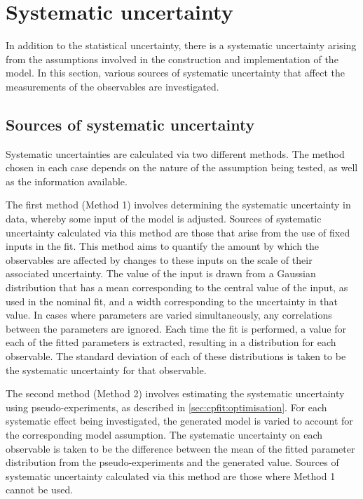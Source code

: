 
\section{Systematic uncertainty}
\label{sec:systematics}

In addition to the statistical uncertainty, there is a systematic uncertainty arising from the assumptions involved in the construction and implementation of the model. In this section, various sources of systematic uncertainty that affect the measurements of the \CP observables are investigated. 

\subsection{Sources of systematic uncertainty}

Systematic uncertainties are calculated via two different methods. The method chosen in each case depends on the nature of the assumption being tested, as well as the information available. 

The first method (Method 1) involves determining the systematic uncertainty in data, whereby some input of the model is adjusted. Sources of systematic uncertainty calculated via this method are those that arise from the use of fixed inputs in the \CP fit. This method aims to quantify the amount by which the \CP observables are affected by changes to these inputs on the scale of their associated uncertainty. The value of the input is drawn from a Gaussian distribution that has a mean corresponding to the central value of the input, as used in the nominal fit, and a width corresponding to the uncertainty in that value. In cases where parameters are varied simultaneously, any correlations between the parameters are ignored. Each time the \CP fit is performed, a value for each of the fitted parameters is extracted, resulting in a distribution for each \CP observable. The standard deviation of each of these distributions is taken to be the systematic uncertainty for that \CP observable. 

The second method (Method 2) involves estimating the systematic uncertainty using pseudo-experiments, as described in \sect\ref{sec:cpfit:optimisation}. For each systematic effect being investigated, the generated model is varied to account for the corresponding model assumption. The systematic uncertainty on each observable is taken to be the difference between the mean of the fitted parameter distribution from the pseudo-experiments and the generated value. Sources of systematic uncertainty calculated via this method are those where Method 1 cannot be used.

